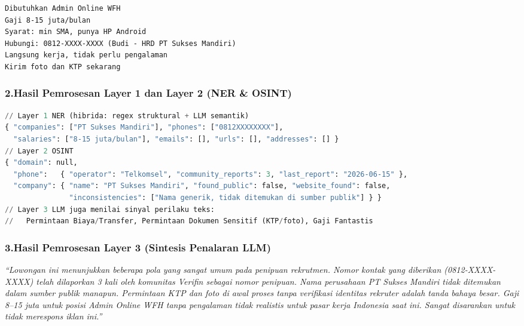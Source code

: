\documentclass[12pt,a4paper]{article}
\begin{document}
\begin{adjustwidth}{1.45cm}{0pt}
\begin{lstlisting}[caption={Contoh teks lowongan yang dianalisis}]
Dibutuhkan Admin Online WFH
Gaji 8-15 juta/bulan
Syarat: min SMA, punya HP Android
Hubungi: 0812-XXXX-XXXX (Budi - HRD PT Sukses Mandiri)
Langsung kerja, tidak perlu pengalaman
Kirim foto dan KTP sekarang
\end{lstlisting}
\end{adjustwidth}

\subsubsection*{2.\quad Hasil Pemrosesan Layer 1 dan Layer 2 (NER \& OSINT)}

\begin{adjustwidth}{1.45cm}{0pt}
\begin{lstlisting}[language=Python, caption={Output ringkas Layer 1--2 (NER hibrida dan OSINT)}]
// Layer 1 NER (hibrida: regex struktural + LLM semantik)
{ "companies": ["PT Sukses Mandiri"], "phones": ["0812XXXXXXXX"],
  "salaries": ["8-15 juta/bulan"], "emails": [], "urls": [], "addresses": [] }
// Layer 2 OSINT
{ "domain": null,
  "phone":   { "operator": "Telkomsel", "community_reports": 3, "last_report": "2026-06-15" },
  "company": { "name": "PT Sukses Mandiri", "found_public": false, "website_found": false,
               "inconsistencies": ["Nama generik, tidak ditemukan di sumber publik"] } }
// Layer 3 LLM juga menilai sinyal perilaku teks:
//   Permintaan Biaya/Transfer, Permintaan Dokumen Sensitif (KTP/foto), Gaji Fantastis
\end{lstlisting}
\end{adjustwidth}

\subsubsection*{3.\quad Hasil Pemrosesan Layer 3 (Sintesis Penalaran LLM)}

\begin{adjustwidth}{1.45cm}{0pt}
\textit{``Lowongan ini menunjukkan beberapa pola yang sangat umum pada penipuan rekrutmen. Nomor
kontak yang diberikan (0812-XXXX-XXXX) telah dilaporkan 3 kali oleh komunitas Verifin sebagai
nomor penipuan. Nama perusahaan PT Sukses Mandiri tidak ditemukan dalam sumber publik manapun.
Permintaan KTP dan foto di awal proses tanpa verifikasi identitas rekruter adalah tanda bahaya
besar. Gaji 8--15 juta untuk posisi Admin Online WFH tanpa pengalaman tidak realistis untuk pasar
kerja Indonesia saat ini. Sangat disarankan untuk tidak merespons iklan ini.''}
\end{adjustwidth}
\end{document}

